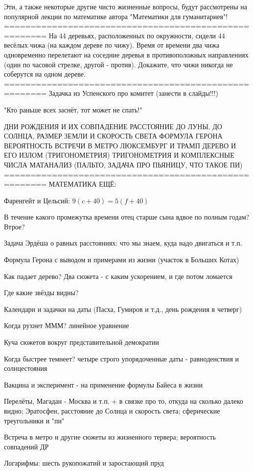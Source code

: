Эти, а также некоторые другие чисто жизненные вопросы, будут рассмотрены
на популярной лекции по математике автора "Математики для гуманитариев"!
======================================================
На 44 деревьях, расположенных по окружности, сидели 44 весёлых чижа (на каждом 
дереве по чижу). Время от времени два чижа одновременно перелетают на соседние 
деревья в противоположных направлениях (один по часовой стрелке, другой - против). 
Докажите, что чижи никогда не соберутся на одном дереве.
======================================================
Задачка из Успенского про комитет (занести в слайды!!!)

"Кто раньше всех заснёт, тот может не спать!"

ДНИ РОЖДЕНИЯ И ИХ СОВПАДЕНИЕ
РАССТОЯНИЕ ДО ЛУНЫ, ДО СОЛНЦА, РАЗМЕР ЗЕМЛИ И СКОРОСТЬ СВЕТА
ФОРМУЛА ГЕРОНА
ВЕРОЯТНОСТЬ ВСТРЕЧИ В МЕТРО
ЛЮКСЕМБУРГ И ТРАМП
ДЕРЕВО И ЕГО ИЗЛОМ (ТРИГОНОМЕТРИЯ)
ТРИГОНОМЕТРИЯ И КОМПЛЕКСНЫЕ ЧИСЛА
МАТАНАЛИЗ (ПАЛЬТО, ЗАДАЧА ПРО ПЬЯНИЦУ, ЧТО ТАКОЕ ПИ)
======================================================
МАТЕМАТИКА ЕЩЁ:

Фаренгейт и Цельсий: $9(c+40) = 5(f+40)$

В течение какого промежутка времени отец старше сына вдвое по полным годам? Втрое?

Задача Эрдёша о равных расстояниях: что мы знаем, куда надо двигаться и т.п.

Формула Герона с выводом и примерами из жизни (участок в Больших Котах)

Как падает дерево? Два сюжета - с каким ускорением, и где потом ломается

Где какие звёзды видны?

Календари и задачки на даты (Пасха, Гумиров и т.д., день рождения в четверг)

Когда рухнет МММ? линейное уравнение

Куча сюжетов вокруг представительной демократии

Когда быстрее темнеет? четыре строго упорядоченные даты - равноденствия и солнцестояния

Вакцина и эксперимент - на применение формулы Байеса в жизни

Перелёты, Магадан - Москва и т.п. + в связке про то, откуда на сколько далеко видно;
Эратосфен, расстояние до Солнца и скорость света; сферические треугольники и "пи"

Встреча в метро и другие сюжеты из жизненного тервера; вероятность совпадений ДР

Логарифмы: шесть рукопожатий и заростающий пруд

